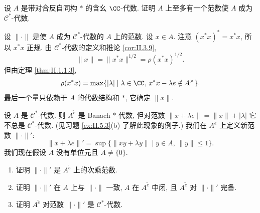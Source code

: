 \begin{exercise}
\label{ex:II.5.5}
设 $A$ 是带对合反自同构 $*$ 的含幺 $\CC$-代数. 证明 $A$ 上至多有一个范数使 $A$ 成为 $\mathcal{C}^*$-代数.
\end{exercise}

\begin{solution}
设 $\|\cdot\|$ 是使 $A$ 成为 $\mathcal{C}^*$-代数的 $A$ 上的范数. 设 $x \in A$. 注意 $(x^*x)^* = x^*x$, 所以 $x^*x$ 正规. 由 $\mathcal{C}^*$-代数的定义和推论 \ref{cor:II.3.9},
\[
\|x\| = \|x^*x\|^{1/2} = \rho(x^*x)^{1/2}.
\]
但由定理 \ref{thm:II.1.1.3},
\[
\rho(x^*x) = \max\{|\lambda| \mid \lambda \in \CC,\, x^*x - \lambda e \notin A^{\times}\}.
\]
最后一个量只依赖于 $A$ 的代数结构和 $*$, 它确定 $\|x\|$.
\end{solution}

\begin{exercise}
\label{ex:II.5.6}
设 $A$ 是 $\mathcal{C}^*$-代数. 则 $A^{\tilde{e}}$ 是 Banach $*$-代数, 但对范数 $\|x + \lambda e\| = \|x\| + |\lambda|$ 它不总是 $\mathcal{C}^*$-代数. (见习题 \ref{ex:II.5.3}(b) 了解此现象的例子.)
我们在 $A^{\tilde{e}}$ 上定义新范数 $\|\cdot\|'$:
\[
\|x + \lambda e\|' = \sup\{\|xy + \lambda y\| \mid y \in A,\, \|y\| \leq 1\}.
\]
我们现在假设 $A$ 没有单位元且 $A \neq \{0\}$.
\begin{enumerate}
\item[(a)] 证明 $\|\cdot\|'$ 是 $A^{\tilde{e}}$ 上的次乘范数.
\item[(b)] 证明 $\|\cdot\|'$ 在 $A$ 上与 $\|\cdot\|$ 一致, $A$ 在 $A^{\tilde{e}}$ 中闭, 且 $A^{\tilde{e}}$ 对 $\|\cdot\|'$ 完备.
\item[(c)] 证明 $A^{\tilde{e}}$ 对范数 $\|\cdot\|'$ 是 $\mathcal{C}^*$-代数.
\end{enumerate}
\end{exercise}

